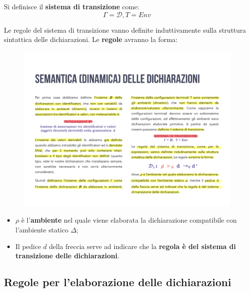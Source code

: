 \documentclass[a4paper]{article}
\begin{document}
	\begin{boxdef}
		Si definisce il \textcolor{Red3}{\textbf{sistema di transizione}} come:
		\begin{equation*}
			\Gamma = \mathcal{D}, T = Env
		\end{equation*}
	\end{boxdef}

	\noindent
	Le regole del sistema di transizione vanno definite induttivamente sulla struttura sintattica delle dichiarazioni. Le \textbf{regole} avranno la forma:
	\begin{figure}[!htp]
		\centering
		\includegraphics[width=.4\textwidth]{img/sistema_di_transizione.pdf}
	\end{figure}

	\begin{itemize}
		\item $\rho$ è l'\textbf{ambiente} nel quale viene elaborata la dichiarazione compatibile con l'ambiente statico $\Delta$;
		
		\item Il pedice $d$ della freccia serve ad indicare che la \textbf{regola è del sistema di transizione delle dichiarazioni}.
	\end{itemize}\newpage
	
	\subsection{Regole per l'elaborazione delle dichiarazioni}
	
\end{document}
